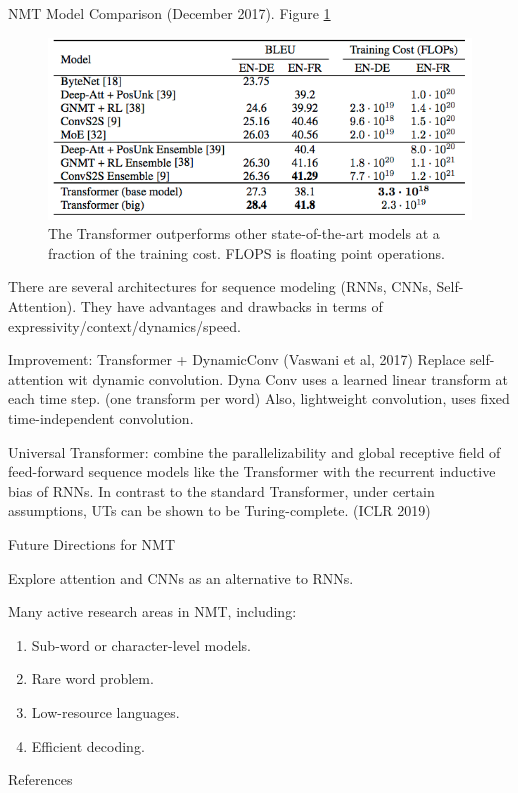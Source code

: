 \documentclass[english]{article}
\begin{document}
\item 
 {NMT Model Comparison (December 2017)}.  Figure \ref{TheT}

\begin{figure}
\centering
\includegraphics[height=0.3\linewidth]{nmt-compare2.png}
\caption{The Transformer outperforms other state-of-the-art models at a fraction of the training cost. FLOPS is floating point operations.}
\label{TheT}
\end{figure}
 

\item There are several architectures for sequence modeling (RNNs, CNNs, Self-Attention). They have advantages and drawbacks in terms of expressivity/context/dynamics/speed.

Improvement: Transformer + DynamicConv (Vaswani et al, 2017) Replace self-attention wit dynamic convolution. Dyna Conv uses a learned linear transform at each time step. (one transform per word) Also, lightweight convolution, uses fixed time-independent convolution.

Universal Transformer: combine the parallelizability and global receptive field of feed-forward sequence models like the Transformer with the recurrent inductive bias of RNNs. In contrast to the standard Transformer, under certain assumptions, UTs can be shown to be Turing-complete. (ICLR 2019)


\item 
 {Future Directions for NMT}

Explore attention and CNNs as an alternative to RNNs.
 
Many active research areas in NMT, including:
\begin{enumerate}
\item Sub-word or character-level models.
\item Rare word problem.
\item Low-resource languages.
\item Efficient decoding.
\end{enumerate}

\item {References}
\end{document}
